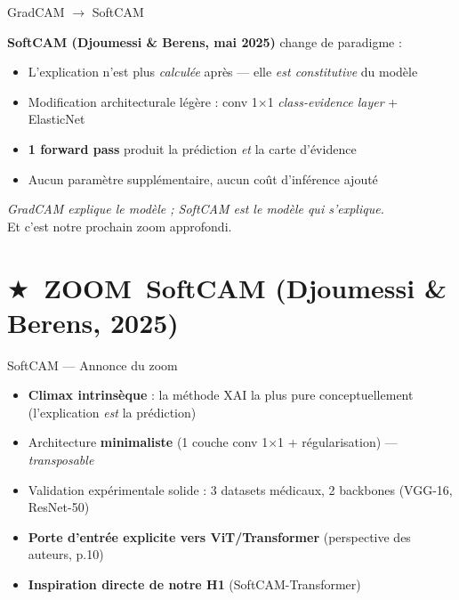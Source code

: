 \documentclass[10pt]{beamer}
\newcommand{\zoomtag}{\textcolor{newcontrib}{\textbf{\large \ensuremath{\bigstar}\ ZOOM}}}
\begin{document}
\begin{frame}{GradCAM $\to$ SoftCAM}
  \begin{plusbox}
    \textbf{SoftCAM (Djoumessi \& Berens, mai 2025)} change de paradigme :
    \begin{itemize}
      \item L'explication n'est plus \emph{calculée} après — elle \emph{est constitutive} du modèle
      \item Modification architecturale légère : conv 1$\times$1 \emph{class-evidence layer} + ElasticNet
      \item \textbf{1 forward pass} produit la prédiction \emph{et} la carte d'évidence
      \item Aucun paramètre supplémentaire, aucun coût d'inférence ajouté
    \end{itemize}
    \vspace{2pt}\centering
    \emph{GradCAM explique le modèle ; SoftCAM est le modèle qui s'explique.}\\
    Et c'est notre prochain zoom approfondi.
  \end{plusbox}
\end{frame}

\section{\zoomtag\ SoftCAM (Djoumessi \& Berens, 2025)}

\begin{frame}{SoftCAM — Annonce du zoom}
  \begin{tcolorbox}[colback=newcontrib!5, colframe=newcontrib!70!black, arc=3mm,
                    fonttitle=\bfseries, title=Pourquoi un zoom approfondi sur SoftCAM ?]
    \begin{itemize}
      \item \textbf{Climax intrinsèque} : la méthode XAI la plus pure conceptuellement (l'explication \emph{est} la prédiction)
      \item Architecture \textbf{minimaliste} (1 couche conv 1$\times$1 + régularisation) — \emph{transposable}
      \item Validation expérimentale solide : 3 datasets médicaux, 2 backbones (VGG-16, ResNet-50)
      \item \textbf{Porte d'entrée explicite vers ViT/Transformer} (perspective des auteurs, p.10)
      \item \textbf{Inspiration directe de notre H1} (SoftCAM-Transformer)
    \end{itemize}
  \end{tcolorbox}
\end{frame}
\end{document}
